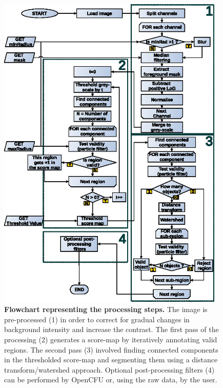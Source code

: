 \documentclass[10pt]{article}
\begin{document}
\begin{figure}[!ht]
\begin{center}
\includegraphics[width=4.27in]{./figPipeline/figFlowChart.eps}
\end{center}
\caption{{\bf Flowchart representing the processing steps.}
The image is pre-processed (1) in order to correct for gradual
changes in background intensity and increase the contrast.
The first pass of the processing (2) generates a score-map by iteratively annotating valid regions.
The second pass (3) involved finding connected components in the thresholded score-map and segmenting them using a distance transform/watershed approach.
Optional post-processing filters (4) can be performed by OpenCFU or, using the raw data, by the user. 
}
\label{figFlowChart}
\end{figure}



\newpage{}
\end{document}
